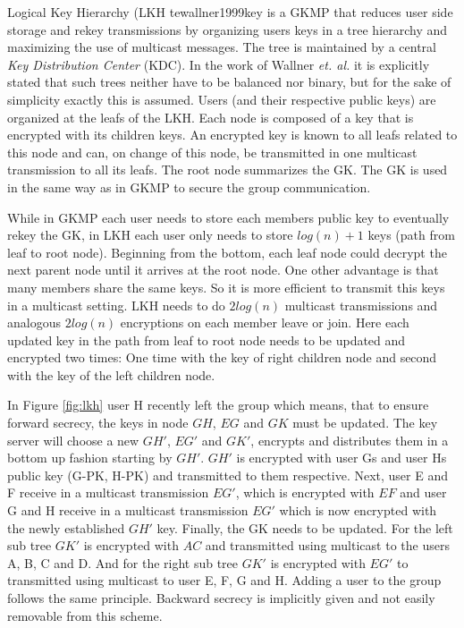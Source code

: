 Logical Key Hierarchy (\ac{LKH} 	te{wallner1999key} is a \ac{GKMP} that reduces user side storage and rekey transmissions by organizing users keys in a tree hierarchy and maximizing the use of multicast messages. The tree is maintained by a central \textit{Key Distribution Center} (\ac{KDC}). In the work of Wallner \textit{et. al.} \cite{wallner1999key} it is explicitly stated that such trees neither have to be balanced nor binary, but for the sake of simplicity exactly this is assumed. Users (and their respective public keys) are organized at the leafs of the LKH. Each node is composed of a key that is encrypted with its children keys. An encrypted key is known to all leafs related to this node and can, on change of this node, be transmitted in one multicast transmission to all its leafs. The root node summarizes the \ac{GK}. The \ac{GK} is used in the same way as in \ac{GKMP} to secure the group communication. 

While in \ac{GKMP} each user needs to store each members public key to eventually rekey the GK, in \ac{LKH} each user only needs to store $log(n) +1$ keys (path from leaf to root node). Beginning from the bottom, each leaf node could decrypt the next parent node until it arrives at the root node. One other advantage is that many members share the same keys. So it is more efficient to transmit this keys in a multicast setting. \ac{LKH} needs to do $2 log(n)$ multicast transmissions and analogous $2 log(n)$ encryptions on each member leave or join.  Here each updated key in the path from leaf to root node needs to be updated and encrypted two times: One time with the key of right children node and second with the key of the left children node. 

In Figure \ref{fig:lkh} user H recently left the group which means, that to ensure forward secrecy, the keys in node $GH$, $EG$ and $GK$ must be updated. The key server will choose a new $GH'$, $EG'$ and $GK'$, encrypts and distributes them in a bottom up fashion starting by $GH'$. $GH'$ is encrypted with user Gs and user Hs public key (G-PK, H-PK) and transmitted to them respective. Next, user E and F receive in a multicast transmission $EG'$, which is encrypted with $EF$ and user G and H receive in a multicast transmission $EG'$ which is now encrypted with the newly established $GH'$ key. Finally, the GK needs to be updated. For the left sub tree $GK'$ is encrypted with $AC$ and transmitted using multicast to the users A, B, C and D. And for the right sub tree $GK'$ is encrypted with $EG'$ to transmitted using multicast to user E, F, G and H. Adding a user to the group follows the same principle. Backward secrecy is implicitly given and not easily removable from this scheme.

